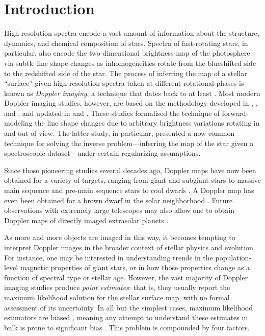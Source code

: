 \documentclass[modern]{aastex631}
\begin{document}
\section{Introduction}

High resolution spectra encode a vast amount of information about the structure, dynamics, and chemical composition of stars.
Spectra of fast-rotating stars, in particular, also encode the two-dimensional brightness map of the photosphere via subtle line shape changes as inhomogeneities rotate from the blueshifted side to the redshifted side of the star.
The process of inferring the map of a stellar ``surface'' given high resolution spectra taken at different rotational phases is known as \emph{Doppler imaging}, a technique that dates back to at least \citet{Deutsch1958}.
Most modern Doppler imaging studies, however, are based on the methodology developed in \citet{Khokhlova1976}, \citet{Goncharskii1977}, and \citet{Goncharskii1982}, and updated in \citet{Vogt1983} and \citet{Vogt1987}. These studies formalised the technique of forward-modeling the line shape changes due to arbitrary brightness variations rotating in and out of view. The latter study, in particular, presented a now common technique for solving the inverse problem---inferring the map of the star given a spectroscopic dataset---under certain regularizing assumptions.

Since those pioneering studies several decades ago, Doppler maps have now been obtained for a variety of targets, ranging from giant and subgiant stars \citep{Donati1999,Strassmeier1999,Roettenbacher2017} to massive main sequence and pre-main sequence stars \citep{Collier1994,Hatzes1995} to cool dwarfs \citep{Rosen2015,Zaire2021}. A Doppler map has even been obtained for a brown dwarf in the solar neighborhood \citep{Crossfield2014}. Future observations with extremely large telescopes may also allow one to obtain Doppler maps of directly imaged extrasolar planets \citep{Snellen2014,Crossfield2014b}.

As more and more objects are imaged in this way, it becomes tempting to interpret Doppler images in the broader context of stellar physics and evolution.
For instance, one may be interested in understanding trends in the population-level magnetic properties of giant stars, or in how those properties change as a function of spectral type or stellar age.
However, the vast majority of Doppler imaging studies produce \emph{point estimates}: that is, they usually report the maximum likelihood solution for the stellar surface map, with no formal assessment of its uncertainty.
In all but the simplest cases, maximum likelihood estimators are biased \citep[e.g.,][]{Lehman1998}, meaning any attempt to understand these estimates in bulk is prone to significant bias \citep[see, e.g.,][]{Hogg2010}.
This problem is compounded by four factors.
\end{document}
